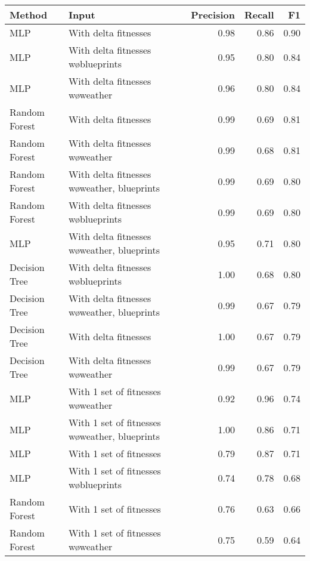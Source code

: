 \begin{tabular}{llrrr}
\toprule
        Method &                                           Input &  Precision &  Recall &   F1 \\
\midrule
           MLP &                            With delta fitnesses &       0.98 &    0.86 & 0.90 \\
           MLP &             With delta fitnesses w\o blueprints &       0.95 &    0.80 & 0.84 \\
           MLP &                With delta fitnesses w\o weather &       0.96 &    0.80 & 0.84 \\
 Random Forest &                            With delta fitnesses &       0.99 &    0.69 & 0.81 \\
 Random Forest &                With delta fitnesses w\o weather &       0.99 &    0.68 & 0.81 \\
 Random Forest &    With delta fitnesses w\o weather, blueprints &       0.99 &    0.69 & 0.80 \\
 Random Forest &             With delta fitnesses w\o blueprints &       0.99 &    0.69 & 0.80 \\
           MLP &    With delta fitnesses w\o weather, blueprints &       0.95 &    0.71 & 0.80 \\
 Decision Tree &             With delta fitnesses w\o blueprints &       1.00 &    0.68 & 0.80 \\
 Decision Tree &    With delta fitnesses w\o weather, blueprints &       0.99 &    0.67 & 0.79 \\
 Decision Tree &                            With delta fitnesses &       1.00 &    0.67 & 0.79 \\
 Decision Tree &                With delta fitnesses w\o weather &       0.99 &    0.67 & 0.79 \\
           MLP &             With 1 set of fitnesses w\o weather &       0.92 &    0.96 & 0.74 \\
           MLP & With 1 set of fitnesses w\o weather, blueprints &       1.00 &    0.86 & 0.71 \\
           MLP &                         With 1 set of fitnesses &       0.79 &    0.87 & 0.71 \\
           MLP &          With 1 set of fitnesses w\o blueprints &       0.74 &    0.78 & 0.68 \\
 Random Forest &                         With 1 set of fitnesses &       0.76 &    0.63 & 0.66 \\
 Random Forest &             With 1 set of fitnesses w\o weather &       0.75 &    0.59 & 0.64 \\

\end{tabular}
